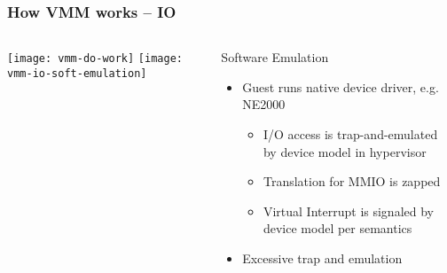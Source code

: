 \begin{frame}[plain]
	\frametitle{How VMM works -- IO}
	
	
	
	\begin{columns}
		
		\begin{column}{.4\textwidth}
			\centering
			\texttt{[image: vmm-do-work]}
			\texttt{[image: vmm-io-soft-emulation]}
		\end{column}
		
		\begin{column}{.6\textwidth}
			Software Emulation
			\begin{itemize}
				\item Guest runs native device driver, e.g. NE2000
				\begin{itemize}
					\item I/O access is trap-and-emulated by device model in hypervisor
					\item Translation for MMIO is zapped
					\item Virtual Interrupt is signaled by device model per semantics
					
				\end{itemize} 
				\item Excessive trap and emulation

			\end{itemize} 	
			
			
		\end{column}
		
		
	\end{columns}
	
	
\end{frame}

